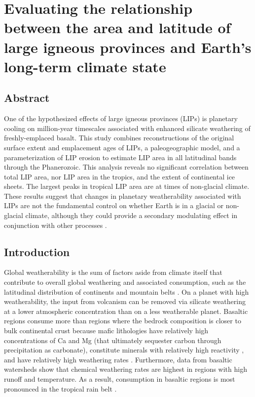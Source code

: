 \chapter[Evaluating the relationship between the area and latitude of large igneous provinces and Earth's long-term climate state][Large igneous provinces]{Evaluating the relationship between the area and latitude of large igneous provinces and Earth's long-term climate state}

\section{Abstract}

One of the hypothesized effects of large igneous provinces (LIPs) is planetary cooling on million-year timescales associated with enhanced silicate weathering of freshly-emplaced basalt. This study combines reconstructions of the original surface extent and emplacement ages of LIPs, a paleogeographic model, and a parameterization of LIP erosion to estimate LIP area in all latitudinal bands through the Phanerozoic. This analysis reveals no significant correlation between total LIP area, nor LIP area in the tropics, and the extent of continental ice sheets. The largest peaks in tropical LIP area are at times of non-glacial climate. These results suggest that changes in planetary weatherability associated with LIPs are not the fundamental control on whether Earth is in a glacial or non-glacial climate, although they could provide a secondary modulating effect in conjunction with other processes \pCOtwo.

\section{Introduction}

Global weatherability is the sum of factors aside from climate itself that contribute to overall global weathering and associated \COtwo consumption, such as the latitudinal distribution of continents and mountain belts \citep{Kump1997a}. On a planet with high weatherability, the \COtwo input from volcanism can be removed via silicate weathering at a lower atmospheric \COtwo concentration than on a less weatherable planet. Basaltic regions consume more \COtwo than regions where the bedrock composition is closer to bulk continental crust because mafic lithologies have relatively high concentrations of Ca and Mg (that ultimately sequester carbon through precipitation as carbonate), constitute minerals with relatively high reactivity \citep{Gislason2003a}, and have relatively high weathering rates \citep{Dessert2003a, Ibarra2016a}. Furthermore, data from basaltic watersheds show that chemical weathering rates are highest in regions with high runoff and temperature. As a result, \COtwo consumption in basaltic regions is most pronounced in the tropical rain belt \citep{Dessert2003a, Hartmann2009a, Hartmann2014a}.


